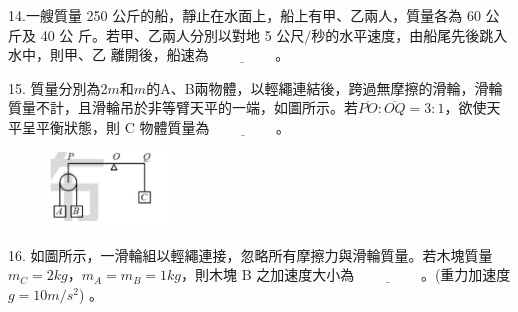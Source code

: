 \documentclass[cn,10pt,math=newtx]{elegantbook}
\begin{document}
\begin{example}
   14.一艘質量 250 公斤的船，靜止在水面上，船上有甲、乙兩人，質量各為 60 公斤及 40 公
斤。若甲、乙兩人分別以對地 5 $公尺/秒$的水平速度，由船尾先後跳入水中，則甲、乙
離開後，船速為$\underline{\hspace{2cm}}$。\\
    \rightline{[桃園聯招教甄109]}
\end{example}
\begin{solution}
    
\end{solution}

\newpage


\begin{example}
   15. 質量分別為2$m$和$m$的A、B兩物體，以輕繩連結後，跨過無摩擦的滑輪，滑輪質量不計，且滑輪吊於非等臂天平的一端，如圖所示。若$\overline{PO}: \overline{OQ}= 3: 1$，欲使天平呈平衡狀態，則 C 物體質量為$\underline{\hspace{2cm}}$。\\
    \rightline{[桃園聯招教甄109]}
\end{example}
\begin{solution}
    
\end{solution}
\begin{figure}[htbp]
    \flushright
    \includegraphics[width=0.3\textwidth]{image/109桃聯15.png}
  \end{figure}
\newpage


\begin{example}
   16. 如圖所示，一滑輪組以輕繩連接，忽略所有摩擦力與滑輪質量。若木塊質量$m_C = 2kg，m_A = m_B = 1kg$，則木塊 B 之加速度大小為$\underline{\hspace{2cm}}$。(重力加速度 $g=10 m/s^2$) 。\\
    \rightline{[桃園聯招教甄109]}
\end{example}
\begin{solution}
    
\end{solution}

\newpage
\end{document}
